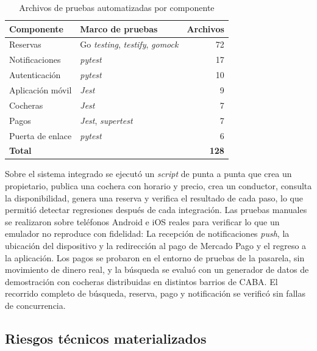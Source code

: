 \documentclass[conference,a4paper]{IEEEtran}
\begin{document}
\begin{table}[!t]
\centering
\caption{Archivos de pruebas automatizadas por componente}
\label{tab:pruebas}
\renewcommand{\arraystretch}{1.2}
\begin{tabular}{l l r}
\toprule
\textbf{Componente} & \textbf{Marco de pruebas} & \textbf{Archivos} \\
\midrule
Reservas & Go \textit{testing}, \textit{testify}, \textit{gomock} & 72 \\
Notificaciones & \textit{pytest} & 17 \\
Autenticación & \textit{pytest} & 10 \\
Aplicación móvil & \textit{Jest} & 9 \\
Cocheras & \textit{Jest} & 7 \\
Pagos & \textit{Jest}, \textit{supertest} & 7 \\
Puerta de enlace & \textit{pytest} & 6 \\
\midrule
\textbf{Total} & & \textbf{128} \\
\bottomrule
\end{tabular}
\end{table}

Sobre el sistema integrado se ejecutó un \textit{script} de punta a punta que crea un propietario, publica una cochera con horario y precio, crea un conductor, consulta la disponibilidad, genera una reserva y verifica el resultado de cada paso, lo que permitió detectar regresiones después de cada integración. Las pruebas manuales se realizaron sobre teléfonos Android e iOS reales para verificar lo que un emulador no reproduce con fidelidad: La recepción de notificaciones \textit{push}, la ubicación del dispositivo y la redirección al pago de Mercado Pago y el regreso a la aplicación. Los pagos se probaron en el entorno de pruebas de la pasarela, sin movimiento de dinero real, y la búsqueda se evaluó con un generador de datos de demostración con cocheras distribuidas en distintos barrios de CABA. El recorrido completo de búsqueda, reserva, pago y notificación se verificó sin fallas de concurrencia.

\subsection{Riesgos técnicos materializados}
\end{document}
